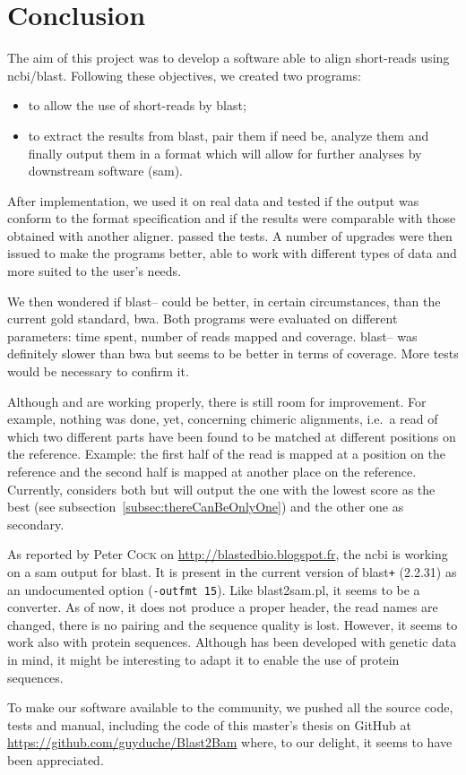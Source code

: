 \chapter{Conclusion}
\label{ch:conclusion}
The aim of this project was to develop a software able to align short-reads using \gls{ncbi}\slash\gls{blast}.
Following these objectives, we created two programs:
\begin{itemize}
    \item \fastqtofasta{} to allow the use of short-reads by \gls{blast};
    \item \blastobam{} to extract the results from \gls{blast}, pair them if need be, analyze them and finally output them in a format which will allow for further analyses by downstream software (\gls{sam}).
\end{itemize}

After implementation, we used it on real data and tested if the output was conform to the format specification and if the results were comparable with those obtained with another aligner.
\blastobam{} passed the tests.
A number of upgrades were then issued to make the programs better, able to work with different types of data and more suited to the user's needs.

We then wondered if \gls{blast}--\blastobam{} could be better, in certain circumstances, than the current gold standard, \gls{bwa}.
Both programs were evaluated on different parameters: time spent, number of reads mapped and coverage.
\gls{blast}--\blastobam{} was definitely slower than \gls{bwa} but seems to be better in terms of coverage.
More tests would be necessary to confirm it.

Although \fastqtofasta{} and \blastobam{} are working properly, there is still room for improvement.
For example, nothing was done, yet, concerning chimeric alignments, i.e.~a read of which two different parts have been found to be matched at different positions on the reference.
Example: the first half of the read is mapped at a position on the reference and the second half is mapped at another place on the reference.
Currently, \blastobam{} considers both but will output the one with the lowest score as the best (see subsection~\ref{subsec:thereCanBeOnlyOne}) and the other one as secondary.

As reported by Peter \textsc{Cock} on \href{http://blastedbio.blogspot.fr/2015/07/ncbi-working-on-sam-output-from-blast.html}{http://blastedbio.blogspot.fr}, the \gls{ncbi} is working on a \gls{sam} output for \gls{blast}. It is present in the current version of \gls{blast}\texttt{+} (2.2.31) as an undocumented option (\texttt{-outfmt 15}).
Like blast2sam.pl, it seems to be a converter. As of now, it does not produce a proper header, the read names are changed, there is no pairing and the sequence quality is lost.
However, it seems to work also with protein sequences.
Although \blastobam{} has been developed with genetic data in mind, it might be interesting to adapt it to enable the use of protein sequences.

To make our software available to the community, we pushed all the source code, tests and manual, including the code of this master's thesis on GitHub at \url{https://github.com/guyduche/Blast2Bam} where, to our delight, it seems to have been appreciated.
